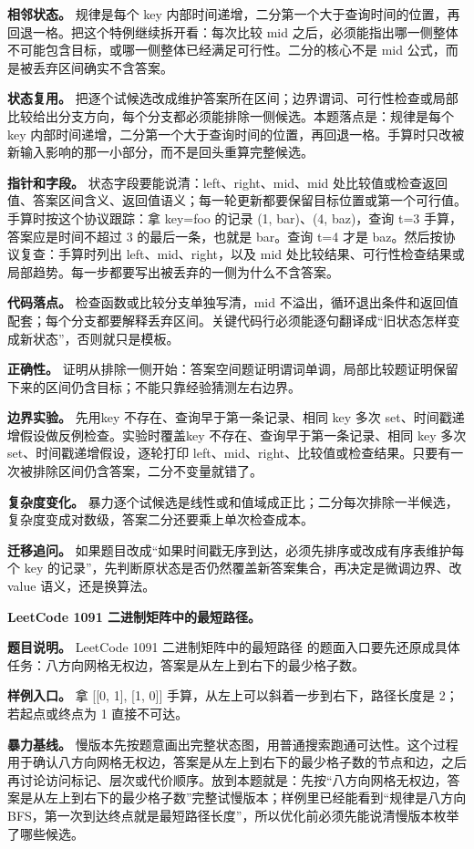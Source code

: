 \textbf{相邻状态。} 规律是每个 key 内部时间递增，二分第一个大于查询时间的位置，再回退一格。把这个特例继续拆开看：每次比较 mid 之后，必须能指出哪一侧整体不可能包含目标，或哪一侧整体已经满足可行性。二分的核心不是 mid 公式，而是被丢弃区间确实不含答案。

\textbf{状态复用。} 把逐个试候选改成维护答案所在区间；边界谓词、可行性检查或局部比较给出分支方向，每个分支都必须能排除一侧候选。本题落点是：规律是每个 key 内部时间递增，二分第一个大于查询时间的位置，再回退一格。手算时只改被新输入影响的那一小部分，而不是回头重算完整候选。

\textbf{指针和字段。} 状态字段要能说清：left、right、mid、mid 处比较值或检查返回值、答案区间含义、返回值语义；每一轮更新都要保留目标位置或第一个可行值。手算时按这个协议跟踪：拿 key=foo 的记录 (1, bar)、(4, baz)，查询 t=3 手算，答案应是时间不超过 3 的最后一条，也就是 bar。查询 t=4 才是 baz。然后按协议复查：手算时列出 left、mid、right，以及 mid 处比较结果、可行性检查结果或局部趋势。每一步都要写出被丢弃的一侧为什么不含答案。

\textbf{代码落点。} 检查函数或比较分支单独写清，mid 不溢出，循环退出条件和返回值配套；每个分支都要解释丢弃区间。关键代码行必须能逐句翻译成“旧状态怎样变成新状态”，否则就只是模板。

\textbf{正确性。} 证明从排除一侧开始：答案空间题证明谓词单调，局部比较题证明保留下来的区间仍含目标；不能只靠经验猜测左右边界。

\textbf{边界实验。} 先用key 不存在、查询早于第一条记录、相同 key 多次 set、时间戳递增假设做反例检查。实验时覆盖key 不存在、查询早于第一条记录、相同 key 多次 set、时间戳递增假设，逐轮打印 left、mid、right、比较值或检查结果。只要有一次被排除区间仍含答案，二分不变量就错了。

\textbf{复杂度变化。} 暴力逐个试候选是线性或和值域成正比；二分每次排除一半候选，复杂度变成对数级，答案二分还要乘上单次检查成本。

\textbf{迁移追问。} 如果题目改成“如果时间戳无序到达，必须先排序或改成有序表维护每个 key 的记录”，先判断原状态是否仍然覆盖新答案集合，再决定是微调边界、改 value 语义，还是换算法。

\noindent\textbf{LeetCode 1091 二进制矩阵中的最短路径。}

\textbf{题目说明。} LeetCode 1091 二进制矩阵中的最短路径 的题面入口要先还原成具体任务：八方向网格无权边，答案是从左上到右下的最少格子数。

\textbf{样例入口。} 拿 [[0, 1], [1, 0]] 手算，从左上可以斜着一步到右下，路径长度是 2；若起点或终点为 1 直接不可达。

\textbf{暴力基线。} 慢版本先按题意画出完整状态图，用普通搜索跑通可达性。这个过程用于确认八方向网格无权边，答案是从左上到右下的最少格子数的节点和边，之后再讨论访问标记、层次或代价顺序。放到本题就是：先按“八方向网格无权边，答案是从左上到右下的最少格子数”完整试慢版本；样例里已经能看到“规律是八方向 BFS，第一次到达终点就是最短路径长度”，所以优化前必须先能说清慢版本枚举了哪些候选。

